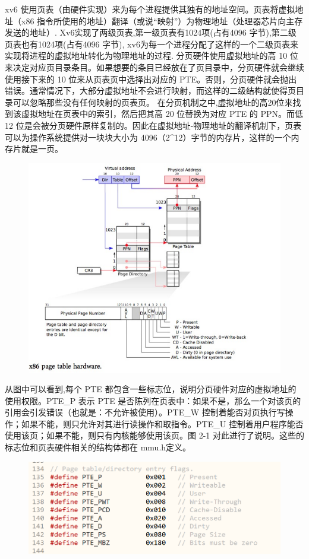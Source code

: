 \documentclass[a4paper,12pt]{report}
\begin{document}
xv6 使用页表（由硬件实现）来为每个进程提供其独有的地址空间。页表将虚拟地址（x86 指令所使用的地址）翻译（或说“映射”）为物理地址（处理器芯片向主存发送的地址）.
Xv6实现了两级页表,第一级页表有1024项(占有4096 字节),第二级页表也有1024项(占有4096 字节), xv6为每一个进程分配了这样的一个二级页表来实现将进程的虚拟地址转化为物理地址的过程. 分页硬件使用虚拟地址的高 10 位来决定对应页目录条目。如果想要的条目已经放在了页目录中，分页硬件就会继续使用接下来的 10 位来从页表页中选择出对应的 PTE。否则，分页硬件就会抛出错误。通常情况下，大部分虚拟地址不会进行映射，而这样的二级结构就使得页目录可以忽略那些没有任何映射的页表页。
在分页机制之中,虚拟地址的高20位来找到该虚拟地址在页表中的索引，然后把其高 20 位替换为对应 PTE 的 PPN。而低 12 位是会被分页硬件原样复制的。因此在虚拟地址-物理地址的翻译机制下，页表可以为操作系统提供对一块块大小为 4096（2\^{}12）字节的内存片，这样的一个内存片就是一页。
\begin{figure}[H]
	\centering
	\includegraphics [width=1.0\textwidth]{figure//media//image3.png}
\end{figure}

从图中可以看到,每个 PTE 都包含一些标志位，说明分页硬件对应的虚拟地址的使用权限。PTE\_P 表示 PTE 是否陈列在页表中：如果不是，那么一个对该页的引用会引发错误（也就是：不允许被使用）。PTE\_W 控制着能否对页执行写操作；如果不能，则只允许对其进行读操作和取指令。PTE\_U 控制着用户程序能否使用该页；如果不能，则只有内核能够使用该页。图 2-1 对此进行了说明。这些的标志位和页表硬件相关的结构体都在 mmu.h定义。
\begin{figure}[H]
	\centering
	\includegraphics [width=1.0\textwidth]{figure//media//image4.png}
\end{figure}
\end{document}
